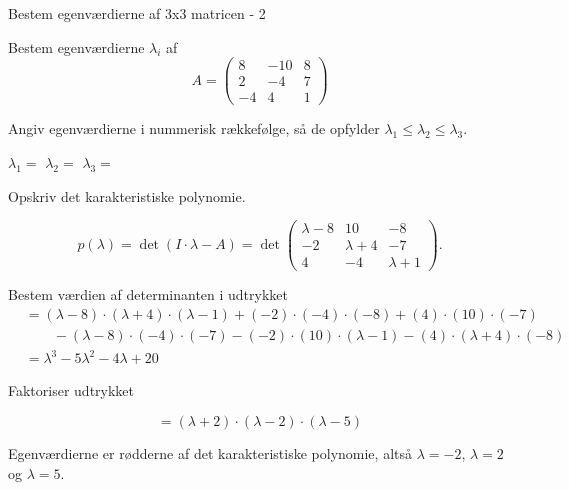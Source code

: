 \documentclass{article}
\begin{document}
\begin{exercise}{Bestem egenværdierne af 3x3 matricen - 2}

Bestem egenværdierne $\lambda_i$ af 
\[
A=\begin{pmatrix}
8 & -10 & 8 \\
2 & -4 & 7 \\
-4 & 4 & 1
\end{pmatrix}
\]

Angiv egenværdierne i nummerisk rækkefølge, så de
opfylder $\lambda_1 \le \lambda_2 \le \lambda_3$.

$\lambda_1 = $
$\lambda_2 = $
$\lambda_3 = $

\hint
Opskriv det karakteristiske polynomie.

\hint
\[
p(\lambda)=\det\left(I \cdot \lambda - A \right)=\det\begin{pmatrix}
\lambda - 8 & 10 & -8 \\
-2 & \lambda + 4 & -7 \\
4 & -4 & \lambda + 1 
\end{pmatrix}.
\]

\hint
Bestem værdien af determinanten i udtrykket
\begin{align*}
&=(\lambda -8) \cdot (\lambda +4) \cdot (\lambda -1)+(-2) \cdot (-4) \cdot (-8)+(4) \cdot (10) \cdot (-7) \\
& \qquad -(\lambda -8) \cdot (-4) \cdot (-7)-(-2) \cdot (10) \cdot (\lambda -1)-(4) \cdot (\lambda +4) \cdot (-8) \\
& = \lambda ^3-5\lambda ^2-4\lambda +20
\end{align*}

\hint
Faktoriser udtrykket

\hint
\[
=(\lambda +2) \cdot (\lambda -2) \cdot (\lambda -5)
\]

\hint
Egenværdierne er rødderne af det karakteristiske polynomie, 
altså
$\lambda=-2$, $\lambda=2$ og $\lambda=5$.

\end{exercise}
\end{document}
